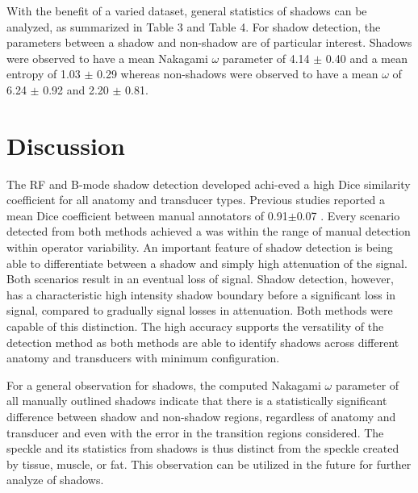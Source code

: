 \documentclass[preprint,5p,authoryear]{elsarticle}
\begin{document}
With the benefit of a varied dataset, general statistics of shadows can be analyzed, as summarized in Table 3 and Table 4. For shadow detection, the parameters between a shadow and non-shadow are of particular interest. Shadows were observed to have a mean Nakagami $\omega$ parameter of 4.14 $\pm$ 0.40 and a mean entropy of 1.03 $\pm$ 0.29 whereas non-shadows were observed to have a mean $\omega$ of 6.24 $\pm$ 0.92 and 2.20 $\pm$ 0.81. 


\section*{Discussion}
\label{Discuss}
The RF and B-mode shadow detection developed achi-eved a high Dice similarity coefficient for all anatomy and transducer types. Previous studies reported a mean Dice coefficient between manual annotators of 0.91$\pm$0.07 \citep{Hellier2010}. Every scenario detected from both methods achieved a was within the range of manual detection within operator variability. An important feature of shadow detection is being able to differentiate between a shadow and simply high attenuation of the signal. Both scenarios result in an eventual loss of signal. Shadow detection, however, has a characteristic high intensity shadow boundary before a significant loss in signal, compared to gradually signal losses in attenuation. Both methods were capable of this distinction. The high accuracy supports the versatility of the detection method as both methods are able to identify shadows across different anatomy and transducers with minimum configuration. 

For a general observation for shadows, the computed Nakagami $\omega$ parameter of all manually outlined shadows indicate that there is a statistically significant difference between shadow and non-shadow regions, regardless of anatomy and transducer and even with the error in the transition regions considered. The speckle and its statistics from shadows is thus distinct from the speckle created by tissue, muscle, or fat. This observation can be utilized in the future for further analyze of shadows. 
\end{document}
